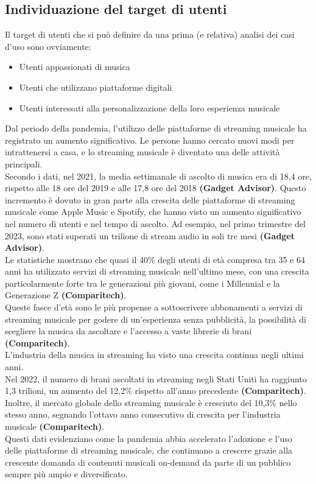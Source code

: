 \documentclass{article}
\begin{document}
		\subsection{Individuazione del target di utenti}
		Il target di utenti che si può definire da una prima (e relativa) analisi dei casi d’uso sono ovviamente:
		\begin{itemize}
			\item Utenti appassionati di musica
			\item Utenti che utilizzano piattaforme digitali
			\item Utenti interessati alla personalizzazione della loro esperienza musicale
		\end{itemize}
		Dal periodo della pandemia, l'utilizzo delle piattaforme di streaming musicale ha registrato un aumento significativo. Le persone hanno cercato nuovi modi per intrattenersi a casa, e lo streaming musicale è diventato una delle attività principali.\\
		Secondo i dati, nel 2021, la media settimanale di ascolto di musica era di 18,4 ore, rispetto alle 18 ore del 2019 e alle 17,8 ore del 2018 \textbf{(Gadget Advisor)}. Questo incremento è dovuto in gran parte alla crescita delle piattaforme di streaming musicale come Apple Music e Spotify, che hanno visto un aumento significativo nel numero di utenti e nel tempo di ascolto. Ad esempio, nel primo trimestre del 2023, sono stati superati un trilione di stream audio in soli tre mesi \textbf{(Gadget Advisor)}.\\
		Le statistiche mostrano che quasi il 40\% degli utenti di età compresa tra 35 e 64 anni ha utilizzato servizi di streaming musicale nell'ultimo mese, con una crescita particolarmente forte tra le generazioni più giovani, come i Millennial e la Generazione Z \textbf{(Comparitech)}.\\ Queste fasce d'età sono le più propense a sottoscrivere abbonamenti a servizi di streaming musicale per godere di un'esperienza senza pubblicità, la possibilità di scegliere la musica da ascoltare e l'accesso a vaste librerie di brani \textbf{(Comparitech)}.\\
		L'industria della musica in streaming ha visto una crescita continua negli ultimi anni. \\Nel 2022, il numero di brani ascoltati in streaming negli Stati Uniti ha raggiunto 1,3 trilioni, un aumento del 12,2\% rispetto all'anno precedente \textbf{(Comparitech)}. Inoltre, il mercato globale dello streaming musicale è cresciuto del 10,3\% nello stesso anno, segnando l'ottavo anno consecutivo di crescita per l'industria musicale \textbf{(Comparitech)}.\\
		Questi dati evidenziano come la pandemia abbia accelerato l'adozione e l'uso delle piattaforme di streaming musicale, che continuano a crescere grazie alla crescente domanda di contenuti musicali on-demand da parte di un pubblico sempre più ampio e diversificato.
\end{document}
